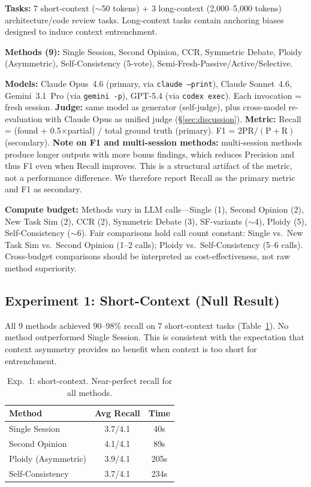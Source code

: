 \documentclass{article}
\begin{document}
\textbf{Tasks:} 7 short-context ($\sim$50 tokens) + 3 long-context (2,000--5,000 tokens) architecture/code review tasks. Long-context tasks contain anchoring biases designed to induce context entrenchment.

\textbf{Methods (9):} Single Session, Second Opinion, CCR, Symmetric Debate, Ploidy (Asymmetric), Self-Consistency (5-vote), Semi-Fresh-Passive/Active/Selective.

\textbf{Models:} Claude Opus~4.6 (primary, via \texttt{claude --print}), Claude Sonnet~4.6, Gemini~3.1~Pro (via \texttt{gemini -p}), GPT-5.4 (via \texttt{codex exec}). Each invocation = fresh session. \textbf{Judge:} same model as generator (self-judge), plus cross-model re-evaluation with Claude Opus as unified judge (\S\ref{sec:discussion}). \textbf{Metric:} Recall = (found + 0.5$\times$partial) / total ground truth (primary). F1 = $2\text{PR}/(\text{P}+\text{R})$ (secondary). \textbf{Note on F1 and multi-session methods:} multi-session methods produce longer outputs with more bonus findings, which reduces Precision and thus F1 even when Recall improves. This is a structural artifact of the metric, not a performance difference. We therefore report Recall as the primary metric and F1 as secondary.

\textbf{Compute budget:} Methods vary in LLM calls---Single (1), Second Opinion (2), New Task Sim (2), CCR (2), Symmetric Debate (3), SF-variants ($\sim$4), Ploidy (5), Self-Consistency ($\sim$6). Fair comparisons hold call count constant: Single vs.\ New Task Sim vs.\ Second Opinion (1--2 calls); Ploidy vs.\ Self-Consistency (5--6 calls). Cross-budget comparisons should be interpreted as cost-effectiveness, not raw method superiority.

\subsection{Experiment 1: Short-Context (Null Result)}

All 9 methods achieved 90--98\% recall on 7 short-context tasks (Table~\ref{tab:exp1}). No method outperformed Single Session. This is consistent with the expectation that context asymmetry provides no benefit when context is too short for entrenchment.

\begin{table}[t]
\centering
\caption{Exp.~1: short-context. Near-perfect recall for all methods.}
\label{tab:exp1}
\footnotesize
\begin{tabular}{@{}lcc@{}}
\toprule
\textbf{Method} & \textbf{Avg Recall} & \textbf{Time} \\
\midrule
Single Session & 3.7/4.1 & 40s \\
Second Opinion & 4.1/4.1 & 89s \\
Ploidy (Asymmetric) & 3.9/4.1 & 205s \\
Self-Consistency & 3.7/4.1 & 234s \\
\bottomrule
\end{tabular}
\end{table}
\end{document}
